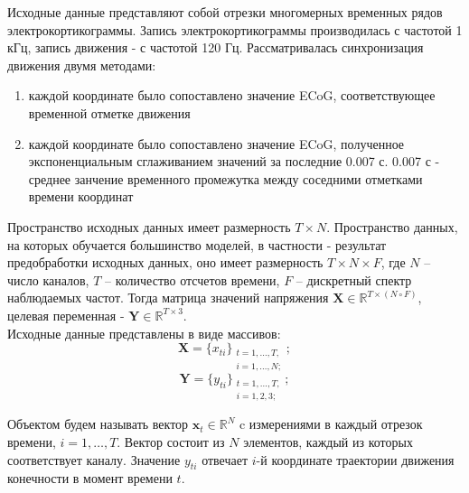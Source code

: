 \documentclass{mipt-thesis-bs}
\begin{document}
Исходные данные представляют собой отрезки многомерных временных рядов электрокортикограммы. Запись электрокортикограммы производилась с частотой 1 кГц, запись движения - с частотой 120 Гц.
Рассматривалась синхронизация движения двумя методами: 
\begin{enumerate}
\item каждой координате было сопоставлено значение ECoG, соответствующее временной отметке движения
\item каждой координате было сопоставлено значение ECoG, полученное экспоненциальным сглаживанием значений за последние 0.007 с. 0.007 с - среднее занчение временного промежутка между соседними отметками времени координат
\end{enumerate}

Пространство исходных данных имеет размерность $T \times N$. Пространство данных, на которых обучается большинство моделей, в частности \cite{Motrenko 2018} - результат предобработки исходных данных, оно имеет размерность $T \times N \times F$, где $N$ – число каналов, $T$ – количество отсчетов времени, $F$ – дискретный спектр наблюдаемых частот. Тогда матрица значений напряжения $\mathbf{X} \in \mathbb{R}^{T \times (N \circ F)}$, целевая переменная - $\mathbf{Y} \in \mathbb{R}^{T \times 3}$. \\


Исходные данные представлены в виде массивов:
\begin{equation}
\mathbf{X} = \{x_{ti}\}_{\substack{t=1,\dots,T,\\ i=1,\dots,N;}};
\end{equation} 
\begin{equation}
\mathbf{Y} = \{y_{ti}\}_{\substack{t=1,\dots,T,\\ i=1,2,3;}};
\end{equation}

Объектом будем называть вектор $\mathbf{x}_t \in \mathbb{R}^{N}$ c измерениями в каждый отрезок времени, $i = 1,\dots,T$. Вектор состоит из $N$ элементов, каждый из которых соответствует каналу. Значение $y_{ti}$ отвечает $i$-й координате траектории движения конечности в момент времени $t$.\\
\end{document}
